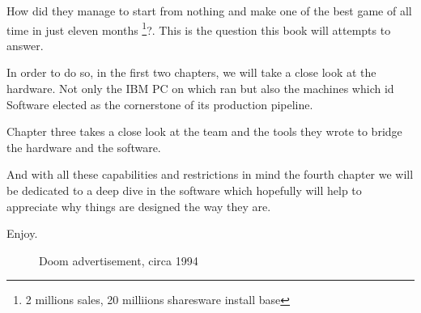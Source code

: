 \par
 How did they manage to start from nothing and make one of the best game of all time in just eleven months \footnote{2 millions sales, 20 milliions sharesware install base}?. This is the question this book will attempts to answer.\\
 \par
  In order to do so, in the first two chapters, we will take a close look at the hardware. Not only the IBM PC on which \doom ran but also the \NeXT machines which id Software elected as the cornerstone of its production pipeline.\\
  \par 
  Chapter three takes a close look at the team and the tools they wrote to bridge the hardware and the software.\\
  \par
  And with all these capabilities and restrictions in mind the fourth chapter we will be dedicated to a deep dive in the software which hopefully will help to appreciate why things are designed the way they are.\\
\par
Enjoy.

\begin{figure}[H]
\centering
{}
\caption{Doom advertisement, circa 1994}
\end{figure}
